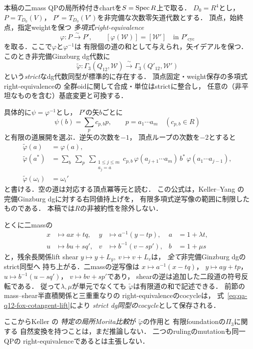 \begin{proposition}
\label{prop:qa-q12-ginzburg-polynomial-right-equivalence}
本稿の二mass QPの局所枠付きchartを$S=\operatorname{Spec} R$上で取る．
$D_0=R^4$とし，$P=T_{D_0}(V)$，
$P'=T_{D_0}(V')$を非完備な次数零矢道代数とする．
頂点，始終点，指定weightを保つ
\emph{多項式right-equivalence}
\[
 \varphi:P\xrightarrow{\sim}P',
 \qquad [\varphi(\mathcal W)]=[\mathcal W']
        \quad\text{in }P'_{\mathrm{cyc}}
 \tag{PE}\label{eq:qa-q12-polynomial-right-equivalence}
\]
を取る．ここで$\varphi$と$\varphi^{-1}$は
有限個の道の和として与えられ，矢イデアルを保つ．
このとき非完備Ginzburg dg代数に
\[
 \boxed{\quad
 \widetilde\varphi:
 \Gamma_3(Q_{12},\mathcal W)
 \xrightarrow{\ \sim\ }
 \Gamma_3(Q'_{12},\mathcal W')
 \quad}
 \tag{PG}\label{eq:qa-q12-polynomial-ginzburg-strict-lift}
\]
という\emph{strict}なdg代数同型が標準的に存在する．
頂点固定・weight保存の多項式right-equivalenceの
全群oidに関して合成・単位はstrictに整合し，
任意の（非平坦なものを含む）基底変更と可換する．

具体的に$\psi=\varphi^{-1}$とし，
$P'$の矢$b$ごとに
\[
 \psi(b)=\sum_{p}c_{p,b}p,\qquad
 p=a_1\cdots a_m\quad(c_{p,b}\in R)
\]
と有限の道展開を選ぶ．逆矢の次数を$-1$，
頂点ループの次数を$-2$とすると
\[
 \begin{split}
 \widetilde\varphi(a)&=\varphi(a),\\
 \widetilde\varphi(a^*)&=
 \sum_{b}\ \sum_{p}\ \sum_{\substack{1\le j\le m\\a_j=a}}
 c_{p,b}\,
 \varphi(a_{j+1}\cdots a_m)\,
 b^*\,
 \varphi(a_1\cdots a_{j-1}),\\
 \widetilde\varphi(\omega_i)&=\omega_i'
 \end{split}
 \tag{FC}\label{eq:qa-q12-fox-cotangent-lift}
\]
と書ける．空の道は対応する頂点冪等元と読む．
この公式は，Keller--Yang
\cite[Lemma~2.9]{KellerYang2011}の
完備Ginzburg dgに対する右同値持上げを，
有限多項式逆写像の範囲に制限したものである．
本稿では$R$の非被約性を除外しない．

とくに二massの
\[
 \begin{aligned}
 x&\longmapsto ax+tq,&
 y&\longmapsto a^{-1}(y-tp),&
 a&=1+\lambda t,\\
 u&\longmapsto bu+sq',&
 v&\longmapsto b^{-1}(v-sp'),&
 b&=1+\mu s
 \end{aligned}
 \tag{MG}\label{eq:qa-q12-mass-polynomial-dg-lift}
\]
と，残余長関係lift shear
$y\mapsto y+L_y,\ v\mapsto v+L_v$は，
\emph{全て}非完備Ginzburg dgのstrict同型へ
持ち上がる．二massの逆写像は
$x\mapsto a^{-1}(x-tq)$，
$y\mapsto ay+tp$，
$u\mapsto b^{-1}(u-sq')$，
$v\mapsto bv+sp'$であり，
shearの逆は追加した二段道の符号反転である．
従って$\lambda,\mu$が単元でなくても
$\widetilde\varphi$は有限道の和で記述できる．
前節のmass--shear半直積関係と三重重なりの
right-equivalenceのcocycleは，
式~\eqref{eq:qa-q12-fox-cotangent-lift}により
\emph{strict dg同型のcocycle}として保存される．

ここからKeller
\cite[Proposition~6.8]{KellerDeformedCY2011}の
\emph{特定の局所Morita比較}が
$\widetilde\varphi$の作用と
有限foundationの$\Pi_3$に関する
自然変換を持つことは，まだ推論しない．
二つのrulingのmutationも同一QPの
right-equivalenceであるとは主張しない．
\end{proposition}
